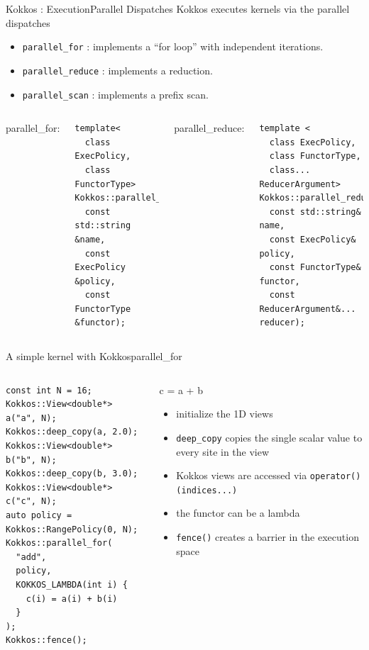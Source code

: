 \begin{frame}[fragile]{Kokkos : Execution}{Parallel Dispatches}
  Kokkos executes kernels via the parallel dispatches

  \begin{itemize}
    \item \verb|parallel_for| : implements a “for loop” with independent iterations.
    \item \verb|parallel_reduce| : implements a reduction.
    \item \verb|parallel_scan| : implements a prefix scan.
  \end{itemize}

  \begin{columns}
      parallel\_for:
      \begin{verbatim}
template<
  class ExecPolicy, 
  class FunctorType>
Kokkos::parallel_for(
  const std::string &name, 
  const ExecPolicy &policy, 
  const FunctorType &functor);
      \end{verbatim}
    parallel\_reduce:
    \begin{verbatim}
template <
  class ExecPolicy, 
  class FunctorType, 
  class... ReducerArgument>
Kokkos::parallel_reduce(
  const std::string& name,
  const ExecPolicy& policy,
  const FunctorType& functor,
  const ReducerArgument&... reducer);
    \end{verbatim}
  \end{columns}
\end{frame}

\begin{frame}[fragile]{A simple kernel with Kokkos}{parallel\_for}
  \begin{columns}
      \begin{verbatim}
const int N = 16;
Kokkos::View<double*> a("a", N);
Kokkos::deep_copy(a, 2.0);
Kokkos::View<double*> b("b", N);
Kokkos::deep_copy(b, 3.0);
Kokkos::View<double*> c("c", N);
auto policy = Kokkos::RangePolicy(0, N);
Kokkos::parallel_for(
  "add",
  policy,
  KOKKOS_LAMBDA(int i) {
    c(i) = a(i) + b(i)
  }
);
Kokkos::fence();
      \end{verbatim}
      \begin{block}{c = a + b}
        \begin{itemize}
          \item initialize the 1D views
          \item \verb|deep_copy| copies the single scalar value to every site in the view
          \item Kokkos views are accessed via \verb|operator()(indices...)|
          \item the functor can be a lambda
          \item \verb|fence()| creates a barrier in the execution space
        \end{itemize}
      \end{block}
  \end{columns}
\end{frame}

